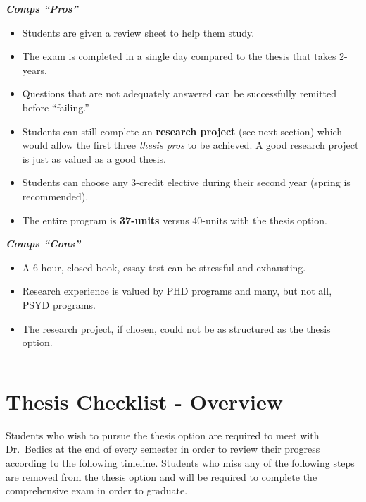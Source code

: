 \documentclass[openany]{book}
\providecommand{\tightlist}{%
  \setlength{\itemsep}{0pt}\setlength{\parskip}{0pt}}
\begin{document}
\textbf{\emph{Comps ``Pros''}}

\begin{itemize}
\tightlist
\item
  Students are given a review sheet to help them study.
\item
  The exam is completed in a single day compared to the thesis that takes 2-years.
\item
  Questions that are not adequately answered can be successfully remitted before ``failing.''
\item
  Students can still complete an \textbf{research project} (see next section) which would allow the first three \emph{thesis pros} to be achieved. A good research project is just as valued as a good thesis.
\item
  Students can choose any 3-credit elective during their second year (spring is recommended).
\item
  The entire program is \textbf{37-units} versus 40-units with the thesis option.
\end{itemize}

\textbf{\emph{Comps ``Cons''}}

\begin{itemize}
\tightlist
\item
  A 6-hour, closed book, essay test can be stressful and exhausting.
\item
  Research experience is valued by PHD programs and many, but not all, PSYD programs.
\item
  The research project, if chosen, could not be as structured as the thesis option.
\end{itemize}

\begin{center}\rule{0.5\linewidth}{0.5pt}\end{center}

\hypertarget{thesis-checklist---overview}{%
\chapter{Thesis Checklist - Overview}\label{thesis-checklist---overview}}

Students who wish to pursue the thesis option are required to meet with Dr.~Bedics at the end of every semester in order to review their progress according to the following timeline. Students who miss any of the following steps are removed from the thesis option and will be required to complete the comprehensive exam in order to graduate.
\end{document}
